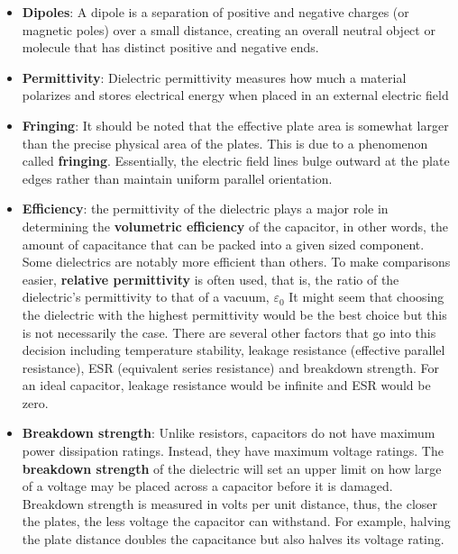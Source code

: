 \documentclass{report}
\begin{document}
\begin{itemize}
            \bigbreak \noindent 
            In polarization, the charges cannot escape because they are tightly bound to the atoms or molecules of the dielectric material. Unlike conductors, dielectrics do not have "free electrons."
        \item \textbf{Dipoles}: A dipole is a separation of positive and negative charges (or magnetic poles) over a small distance, creating an overall neutral object or molecule that has distinct positive and negative ends.
        \item \textbf{Permittivity}: Dielectric permittivity measures how much a material polarizes and stores electrical energy when placed in an external electric field
        \item \textbf{Fringing}: It should be noted that the effective plate area is somewhat larger than the precise physical area of the plates. This is due to a phenomenon called \textbf{fringing}. Essentially, the electric field lines bulge outward at the plate edges rather than maintain uniform parallel orientation.
            \bigbreak \noindent 
        \item \textbf{Efficiency}: the permittivity of the dielectric plays a major role in determining the \textbf{volumetric efficiency} of the capacitor, in other words, the amount of capacitance that can be packed into a given sized component. Some dielectrics are notably more efficient than others. To make comparisons easier, \textbf{relative permittivity} is often used, that is, the ratio of the dielectric's permittivity to that of a vacuum, $\varepsilon_{0}$
            \bigbreak \noindent 
            It might seem that choosing the dielectric with the highest permittivity would be the best choice but this is not necessarily the case. There are several other factors that go into this decision including temperature stability, leakage resistance (effective parallel resistance), ESR (equivalent series resistance) and breakdown strength. For an ideal capacitor, leakage resistance would be infinite and ESR would be zero.
        \item \textbf{Breakdown strength}: Unlike resistors, capacitors do not have maximum power dissipation ratings. Instead, they have maximum voltage ratings. The \textbf{breakdown strength} of the dielectric will set an upper limit on how large of a voltage may be placed across a capacitor before it is damaged.
            \bigbreak \noindent 
            Breakdown strength is measured in volts per unit distance, thus, the closer the plates, the less voltage the capacitor can withstand. For example, halving the plate distance doubles the capacitance but also halves its voltage rating.

\end{itemize}
\end{document}
